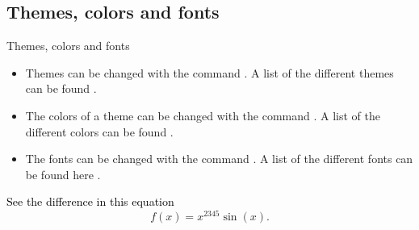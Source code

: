 \documentclass{beamer}
\begin{document}

\begin{frame}
\centering
{}
\end{frame}

\begin{frame}
\end{frame}

\begin{frame}
\end{frame}

\begin{frame}
\end{frame}



\subsection[Themes]{Themes, colors and fonts}

\begin{frame}{Themes, colors and fonts}
\begin{itemize}
	\item 
		Themes can be changed with the command . \pause 
		A list of the different themes can be found . \pause
	\item 
		The colors of a theme can be changed with the command . \pause
		A list of the different colors can be found . \pause
	\item 
		The fonts can be changed with the command . \pause
		A list of the different fonts can be found here . \pause
\end{itemize}
\textcolor{black}{See the difference in this equation}
\begin{equation}
	f(x) = x^{2345}\sin(x) .
\end{equation}
\end{frame}
\end{document}
